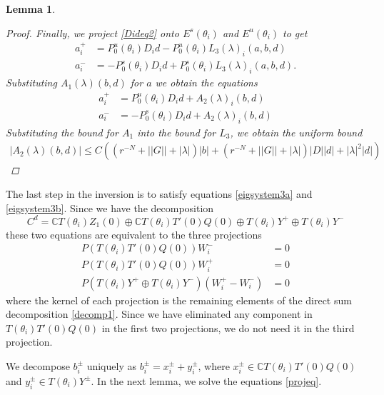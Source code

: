 \documentclass[12pt]{elsarticle}
\def\C{{\mathbb C}}
\newtheorem{lemma}{Lemma}
\begin{document}
\begin{lemma}
\begin{proof}
\noindent Finally, we project \eqref{Dideq2} onto $E^s(\theta_i)$ and $E^u(\theta_i)$ to get
\begin{align*}
a_i^+ &= P_0^u(\theta_i) D_i d - P_0^u(\theta_i) L_3(\lambda)_i(a,b,d) \\
a_i^- &= -P_0^s(\theta_i) D_i d + P_0^s(\theta_i) L_3(\lambda)_i(a,b,d).
\end{align*}
Substituting $A_1(\lambda)(b,d)$ for $a$ we obtain the equations
\begin{align*}
a_i^+ &= P_0^u(\theta_i) D_i d + A_2(\lambda)_i(b,d) \\
a_i^- &= -P_0^s(\theta_i) D_i d + A_2(\lambda)_i(b,d)
\end{align*}
Substituting the bound for $A_1$ into the bound for $L_3$, we obtain the uniform bound
\begin{align*}
|A_2(\lambda)(b,d)| \leq 
C\left( (r^{-N} + ||G|| + |\lambda| )|b| + (r^{-N} + ||G|| + |\lambda|)|D||d| + |\lambda|^2 |d|  \right)
\end{align*}
\end{proof}
\end{lemma}

The last step in the inversion is to satisfy equations \eqref{eigsystem3a} and \eqref{eigsystem3b}. Since we have the decomposition
\begin{equation}\label{decomp1}
C^d = \C T(\theta_i) Z_1(0) \oplus \C T(\theta_i) T'(0)Q(0) \oplus T(\theta_i) Y^+ \oplus T(\theta_i) Y^-
\end{equation}
these two equations are equivalent to the three projections
\begin{equation}\label{projeq}
\begin{aligned}
P(T(\theta_i) T'(0)Q(0)) W_i^- &= 0 \\
P(T(\theta_i) T'(0)Q(0)) W_i^+ &= 0 \\
P(T(\theta_i) Y^+ \oplus T(\theta_i) Y^-) (W_i^+ - W_i^-) &= 0
\end{aligned}
\end{equation}
where the kernel of each projection is the remaining elements of the direct sum decomposition \eqref{decomp1}. Since we have eliminated any component in $T(\theta_i) T'(0)Q(0)$ in the first two projections, we do not need it in the third projection.

We decompose $b_i^\pm$ uniquely as $b_i^\pm = x_i^\pm + y_i^\pm$, where $x_i^\pm \in \C T(\theta_i) T'(0)Q(0)$ and $y_i^\pm \in T(\theta_i) Y^\pm$. In the next lemma, we solve the equations \eqref{projeq}.
\end{document}
